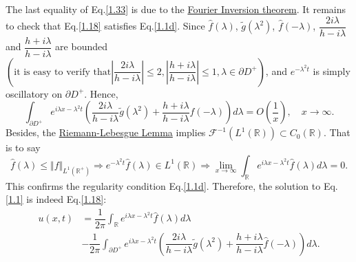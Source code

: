 \documentclass[12pt]{article}
\numberwithin{equation}{section}
\begin{document}
The last equality of Eq.\eqref{1.33} is due to the \href{https://w.wiki/9av5}{Fourier Inversion theorem}.
It remains to check that Eq.\eqref{1.18} satisfies Eq.\eqref{1.1d}. Since $\hat{f}(\lambda)$, $\tilde{g}(\lambda^2)$, $\hat{f}(-\lambda)$, $\dfrac{2i\lambda}{h-i\lambda}$ and $\dfrac{h+i\lambda}{h-i\lambda}$ are bounded$\left(\text{it is easy to verify that}\left|\dfrac{2i\lambda}{h-i\lambda}\right|\leqslant 2, \left|\dfrac{h+i\lambda}{h-i\lambda}\right|\leqslant 1, \lambda\in \partial D^+\right)$, and $e^{-\lambda^2 t}$ is simply oscillatory on $\partial D^+$. Hence,
\begin{equation*}
    \int_{\partial D^+} e^{i\lambda x-\lambda^2 t}\left(\dfrac{2i\lambda}{h-i\lambda}\tilde{g}(\lambda^2)+\dfrac{h+i\lambda}{h-i\lambda}\hat{f}(-\lambda)\right) d\lambda=O(\dfrac{1}{x}),\quad x\to\infty.
\end{equation*}
Besides, the \href{https://w.wiki/9c$f}{Riemann-Lebesgue Lemma} implies $\mathcal{F}^{-1}(L^1(\mathbb{R}))\subset C_0(\mathbb{R})$. That is to say
\begin{equation*}
    \hat{f}(\lambda)\leqslant \Vert f\Vert_{L^1(\mathbb{R^+})}\Rightarrow e^{-\lambda^2 t}\hat{f}(\lambda)\in L^1(\mathbb{R})\Rightarrow \lim\limits_{x\to\infty} \int_{\mathbb{R}}e^{i\lambda x-\lambda^2 t}\hat{f}(\lambda)d\lambda=0.
\end{equation*}
This confirms the regularity condition Eq.\eqref{1.1d}.
Therefore, the solution to Eq.\eqref{1.1} is indeed Eq.\eqref{1.18}:
\begin{equation*}
    \begin{split}
        u(x,t)&=\dfrac{1}{2\pi}\int_{\mathbb{R}}e^{i\lambda x-\lambda^2 t}\hat{f}(\lambda)d\lambda\\
        &-\dfrac{1}{2\pi} \int_{\partial D^+} e^{i\lambda x-\lambda^2 t}\left(\dfrac{2i\lambda}{h-i\lambda}\tilde{g}(\lambda^2)+\dfrac{h+i\lambda}{h-i\lambda}\hat{f}(-\lambda)\right) d\lambda.
    \end{split}
\end{equation*}
\vspace{2mm}
\end{document}
